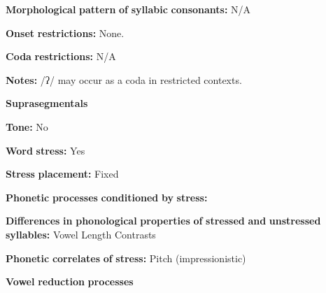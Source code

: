 \begin{styleBody}
\textbf{Morphological} \textbf{pattern} \textbf{of} \textbf{syllabic} \textbf{consonants:} N/A
\end{styleBody}

\begin{styleBody}
\textbf{Onset} \textbf{restrictions:} None.
\end{styleBody}

\begin{styleBody}
\textbf{Coda} \textbf{restrictions:} N/A
\end{styleBody}

\begin{styleBody}
\textbf{Notes:} /ʔ/ may occur as a coda in restricted contexts.
\end{styleBody}

\begin{styleBody}
\textbf{Suprasegmentals}
\end{styleBody}

\begin{styleBody}
\textbf{Tone:} No
\end{styleBody}

\begin{styleBody}
\textbf{Word} \textbf{stress:} Yes
\end{styleBody}

\begin{styleBody}
\textbf{Stress} \textbf{placement:} Fixed
\end{styleBody}

\begin{styleBody}
\textbf{Phonetic} \textbf{processes} \textbf{conditioned} \textbf{by} \textbf{stress:}
\end{styleBody}

\begin{styleBody}
\textbf{Differences} \textbf{in} \textbf{phonological} \textbf{properties} \textbf{of} \textbf{stressed} \textbf{and} \textbf{unstressed} \textbf{syllables:} Vowel Length Contrasts
\end{styleBody}

\begin{styleBody}
\textbf{Phonetic} \textbf{correlates} \textbf{of} \textbf{stress:} Pitch (impressionistic)
\end{styleBody}

\begin{styleBody}
\textbf{Vowel} \textbf{reduction} \textbf{processes}
\end{styleBody}

